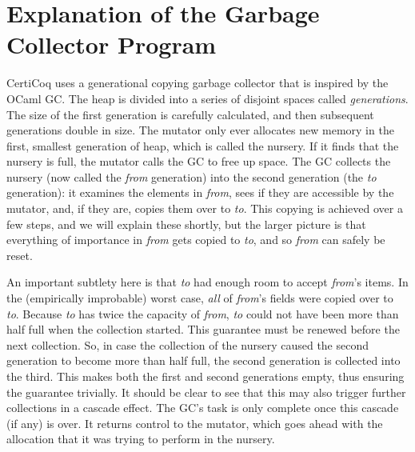 \section{Explanation of the Garbage Collector Program}
\label{apx:gcstructure}


CertiCoq uses a generational copying garbage collector 
that is inspired by the OCaml GC. 
The heap is divided into a series of disjoint
spaces called \emph{generations}. The size of the first generation
is carefully calculated, and then subsequent generations
double in size.
The mutator only ever allocates new memory in the first, 
smallest generation of heap, which is called the nursery. 
If it finds that the nursery is full, 
the mutator calls the GC to free up space.
The GC collects the nursery 
(now called the \emph{from} generation)
into the second generation (the \emph{to} generation): 
it examines the elements 
in \emph{from}, sees if they are accessible by
the mutator, and, if they are, 
copies them over to \emph{to}. This copying is achieved over a few steps, 
and we will explain these shortly, but the larger picture is that 
everything of importance in \emph{from} gets copied to \emph{to}, 
and so \emph{from} can safely be reset. 

An important subtlety here is that \emph{to} had enough 
room to accept \emph{from}'s items. 
In the (empirically improbable) worst case, 
\emph{all} of \emph{from}'s fields were copied over to \emph{to}.
Because \emph{to} has twice the capacity of \emph{from},
\emph{to} could not have been more than half full when 
the collection started.
This guarantee must be renewed before the next collection. 
So, in case the collection of the nursery caused
the second generation to become more than half full, 
the second generation is collected into the third. This makes 
both the first and second generations empty, thus ensuring 
the guarantee trivially. It should be 
clear to see that this may also trigger further collections in 
a cascade effect. The GC's task is only complete once this 
cascade (if any) is over. It returns control to the mutator,
which goes ahead with 
the allocation that it was trying to perform in the nursery.

